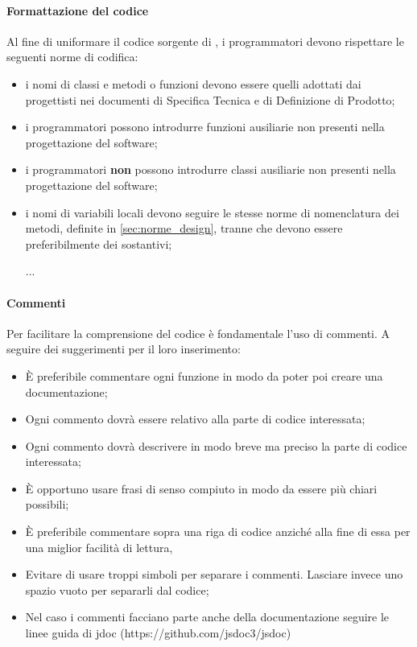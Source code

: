 		\paragraph{Formattazione del codice}
		Al fine di uniformare il codice sorgente di \proj, i programmatori devono rispettare le seguenti norme di codifica:
			\begin{itemize}
				\item i nomi di classi e metodi o funzioni devono essere quelli adottati dai progettisti nei documenti di Specifica Tecnica e di Definizione di Prodotto;
				\item i programmatori possono introdurre funzioni ausiliarie non presenti nella progettazione del software;
				\item i programmatori \textbf{non} possono introdurre classi ausiliarie non presenti nella progettazione del software;
				\item i nomi di variabili locali devono seguire le stesse norme di nomenclatura dei metodi, definite in \ref{sec:norme_design}, tranne che devono essere preferibilmente dei sostantivi;
				\item [...]
			\end{itemize}
		\paragraph{Commenti}
		Per facilitare la comprensione del codice è fondamentale l'uso di commenti. A seguire dei suggerimenti per il loro inserimento:
		\begin{itemize}
			\item È preferibile commentare ogni funzione in modo da poter poi creare una documentazione;
			\item Ogni commento dovrà essere relativo alla parte di codice interessata;
			\item Ogni commento dovrà descrivere in modo breve ma preciso la parte di codice interessata;
			\item È opportuno usare frasi di senso compiuto in modo da essere più chiari possibili;
			\item È preferibile commentare sopra una riga di codice anziché alla fine di essa per una miglior facilità di lettura,
			\item Evitare di usare troppi simboli per separare i commenti. Lasciare invece uno spazio vuoto per separarli dal codice;
			\item Nel caso i commenti facciano parte anche della documentazione seguire le linee guida di jdoc (https://github.com/jsdoc3/jsdoc) %
		\end{itemize}

